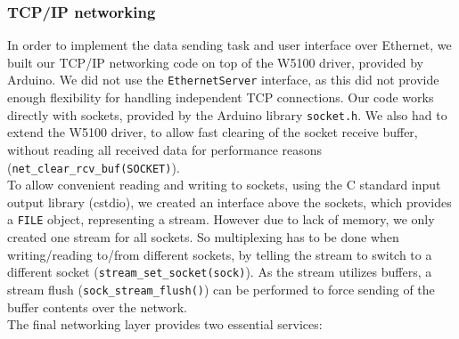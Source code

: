 \documentclass[a4paper]{scrreprt}
\begin{document}
\subsubsection{TCP/IP networking}
In order to implement the data sending task and user interface over Ethernet, we built our TCP/IP networking code on top of the W5100 driver, provided by Arduino. We did not use the \texttt{EthernetServer} interface, as
this did not provide enough flexibility for handling independent TCP connections. Our code works directly with sockets, provided by
the Arduino library \texttt{socket.h}. We also had to extend the W5100 driver, to allow fast clearing of the socket receive buffer,
without reading all received data for performance reasons (\texttt{net\_clear\_rcv\_buf(SOCKET)}).\\
To allow convenient reading and writing to sockets, using the C standard input output library (cstdio), we created an interface
above the sockets, which provides a \texttt{FILE} object, representing a stream. However due to lack of memory, we only created one
stream for all sockets. So multiplexing has to be done when writing/reading to/from different sockets, by telling the stream to switch
to a different socket (\texttt{stream\_set\_socket(sock)}). As the stream utilizes buffers, a stream flush (\texttt{sock\_stream\_flush()})
can be performed to force sending of the buffer contents over the network.\\
The final networking layer provides two essential services:
\end{document}
